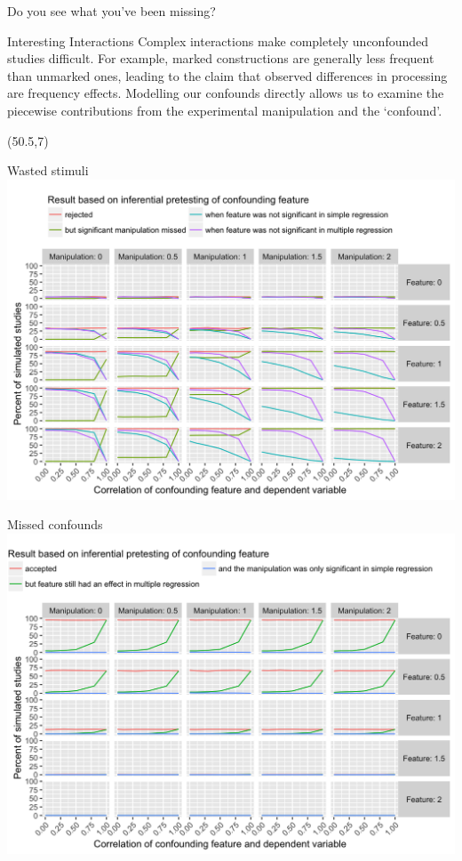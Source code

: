 \documentclass[final]{beamer}
\begin{document}
\begin{frame}{}
\begin{textblock}{48}
\begin{block}{Do you see what you've been missing?}
\end{block}

\begin{block}{Interesting Interactions}
Complex interactions make completely unconfounded studies difficult. 
For example, marked constructions are generally less frequent than unmarked ones, leading to the claim that observed differences in processing are frequency effects.
Modelling our confounds directly allows us to examine the piecewise contributions from the experimental manipulation and the `confound'.

\vspace{.38cm}
\end{block}

\end{textblock}

\begin{textblock}{48}(50.5,7)

\begin{block}{Wasted stimuli}
\includegraphics{rejections.png}
\end{block}

\begin{block}{Missed confounds}
\includegraphics{acceptances.png}
\end{block}


\end{textblock}
\end{frame}
\end{document}
